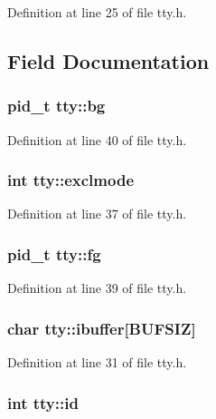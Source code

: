 Definition at line 25 of file tty.\+h.



\subsection{Field Documentation}
\hypertarget{structtty_a68f717ba40f28d6b941f62f0e7255e2e}{
\subsubsection[{bg}]{\setlength{\rightskip}{0pt plus 5cm}pid\+\_\+t tty\+::bg}}\label{structtty_a68f717ba40f28d6b941f62f0e7255e2e}


Definition at line 40 of file tty.\+h.

\hypertarget{structtty_aeb81a44fe3a7067e36a6c2c9194d8dad}{
\subsubsection[{exclmode}]{\setlength{\rightskip}{0pt plus 5cm}int tty\+::exclmode}}\label{structtty_aeb81a44fe3a7067e36a6c2c9194d8dad}


Definition at line 37 of file tty.\+h.

\hypertarget{structtty_a8a6dae366ed6eac05de7d9d463bd04eb}{
\subsubsection[{fg}]{\setlength{\rightskip}{0pt plus 5cm}pid\+\_\+t tty\+::fg}}\label{structtty_a8a6dae366ed6eac05de7d9d463bd04eb}


Definition at line 39 of file tty.\+h.

\hypertarget{structtty_ad876c12571c56724c3277ee634b5dd30}{
\subsubsection[{ibuffer}]{\setlength{\rightskip}{0pt plus 5cm}char tty\+::ibuffer\mbox{[}B\+U\+F\+S\+I\+Z\mbox{]}}}\label{structtty_ad876c12571c56724c3277ee634b5dd30}


Definition at line 31 of file tty.\+h.

\hypertarget{structtty_ababbf2910aa51f41da438d6adca0aca5}{
\subsubsection[{id}]{\setlength{\rightskip}{0pt plus 5cm}int tty\+::id}}\label{structtty_ababbf2910aa51f41da438d6adca0aca5}


